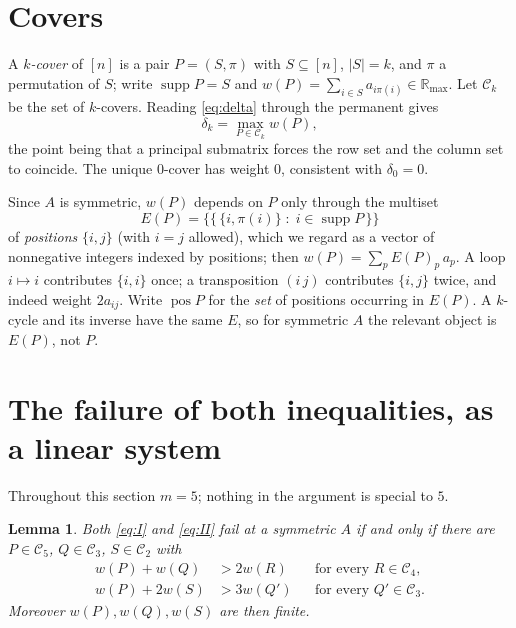 \documentclass[11pt]{amsart}
\newtheorem{lemma}[theorem]{Lemma}
\newcommand{\Rmax}{\mathbb R_{\max}}
\newcommand{\dd}{\delta}
\newcommand{\Cov}{\mathcal C}
\newcommand{\Ee}{E}
\newcommand{\supp}{\operatorname{supp}}
\newcommand{\pos}{\operatorname{pos}}
\begin{document}
\section{Covers}

A \emph{$k$-cover} of $[n]$ is a pair $P=(S,\pi)$ with $S\subseteq[n]$,
$|S|=k$, and $\pi$ a permutation of $S$; write $\supp P=S$ and
$w(P)=\sum_{i\in S}a_{i\pi(i)}\in\Rmax$. Let $\Cov_k$ be the set of $k$-covers.
Reading \eqref{eq:delta} through the permanent gives
\begin{equation}\label{eq:cover}
 \dd_k=\max_{P\in\Cov_k}w(P),
\end{equation}
the point being that a principal submatrix forces the row set and the column set
to coincide. The unique $0$-cover has weight $0$, consistent with $\dd_0=0$.

Since $A$ is symmetric, $w(P)$ depends on $P$ only through the multiset
\[
 \Ee(P)=\bigl\{\!\{\,\{i,\pi(i)\}\;:\;i\in\supp P\,\}\!\bigr\}
\]
of \emph{positions} $\{i,j\}$ (with $i=j$ allowed), which we regard as a vector
of nonnegative integers indexed by positions; then
$w(P)=\sum_p\Ee(P)_p\,a_p$. A loop $i\mapsto i$ contributes $\{i,i\}$ once; a
transposition $(i\,j)$ contributes $\{i,j\}$ twice, and indeed weight
$2a_{ij}$. Write $\pos P$ for the \emph{set} of positions occurring in
$\Ee(P)$. A $k$-cycle and its inverse have the same $\Ee$, so for symmetric $A$
the relevant object is $\Ee(P)$, not $P$.

\section{The failure of both inequalities, as a linear system}

Throughout this section $m=5$; nothing in the argument is special to $5$.

\begin{lemma}\label{lem:reform}
Both \eqref{eq:I} and \eqref{eq:II} fail at a symmetric $A$ if and only if there
are $P\in\Cov_5$, $Q\in\Cov_3$, $S\in\Cov_2$ with
\begin{align}
 w(P)+w(Q)&>2w(R) &&\text{for every }R\in\Cov_4,\label{eq:sysI}\\
 w(P)+2w(S)&>3w(Q') &&\text{for every }Q'\in\Cov_3.\label{eq:sysII}
\end{align}
Moreover $w(P),w(Q),w(S)$ are then finite.
\end{lemma}
\end{document}
